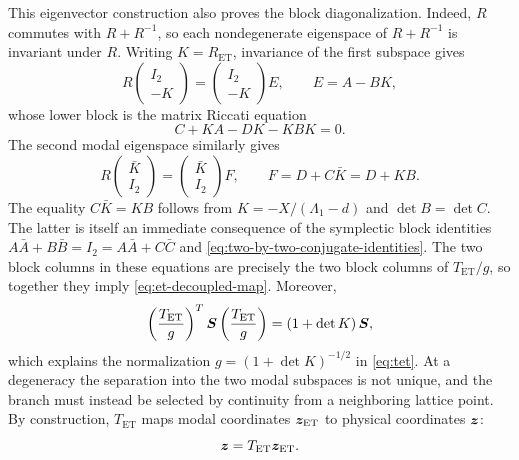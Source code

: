 This eigenvector construction also proves the block diagonalization.  Indeed,
$R$ commutes with $R+R^{-1}$, so each nondegenerate eigenspace of
$R+R^{-1}$ is invariant under $R$.  Writing $K=R_{\mathrm{ET}}$, invariance
of the first subspace gives
\begin{equation}
 R\begin{pmatrix}I_2\\-K\end{pmatrix}
 =\begin{pmatrix}I_2\\-K\end{pmatrix}E,
 \qquad
 E=A-BK,
 \label{eq:first-et-invariant-subspace}
\end{equation}
whose lower block is the matrix Riccati equation
\begin{equation}
 C+KA-DK-KBK=0.
 \label{eq:et-riccati}
\end{equation}
The second modal eigenspace similarly gives
\begin{equation}
 R\begin{pmatrix}\bar K\\I_2\end{pmatrix}
 =\begin{pmatrix}\bar K\\I_2\end{pmatrix}F,
 \qquad
 F=D+C\bar K=D+KB.
 \label{eq:second-et-invariant-subspace}
\end{equation}
The equality $C\bar K=KB$ follows from
$K=-X/(\Lambda_1-d)$ and $\det B=\det C$.  The latter is itself an immediate
consequence of the symplectic block identities
$A\bar A+B\bar B=I_2=A\bar A+C\bar C$ and
\cref{eq:two-by-two-conjugate-identities}.
The two block columns in these equations are precisely the two block columns
of $T_{\mathrm{ET}}/g$, so together they imply
\cref{eq:et-decoupled-map}.  Moreover,
\begin{equation}
 \left(\frac{T_{\mathrm{ET}}}{g}\right)^T
 \bm{S}
 \left(\frac{T_{\mathrm{ET}}}{g}\right)
 =\left(1+\det K\right)\bm{S},
\end{equation}
which explains the normalization $g=(1+\det K)^{-1/2}$ in
\cref{eq:tet}.  At a degeneracy the separation into the two modal subspaces
is not unique, and the branch must instead be selected by continuity from a
neighboring lattice point.
By construction, $T_{\mathrm{ET}}$ maps modal coordinates
$\bm{z}_{\mathrm{ET}}$ to physical coordinates $\bm{z}$:
\begin{equation}
 \bm{z}=T_{\mathrm{ET}}\bm{z}_{\mathrm{ET}}.
\end{equation}


